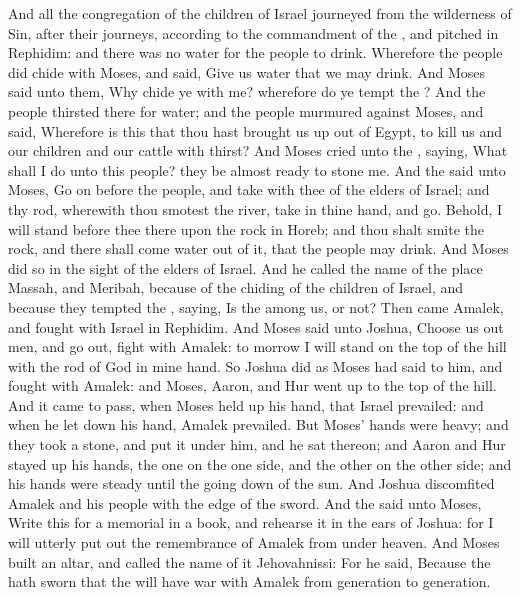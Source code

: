 \begin{biblechapter} %
 And all the congregation of the children of Israel journeyed from the wilderness of Sin, after their journeys, according to the commandment of the \LORD, and pitched in Rephidim: and there was no water for the people to drink.
\verse Wherefore the people did chide with Moses, and said, Give us water that we may drink. And Moses said unto them, Why chide ye with me? wherefore do ye tempt the \LORD?
\verse And the people thirsted there for water; and the people murmured against Moses, and said, Wherefore is this that thou hast brought us up out of Egypt, to kill us and our children and our cattle with thirst?
\verse And Moses cried unto the \LORD, saying, What shall I do unto this people? they be almost ready to stone me.
\verse And the \LORD said unto Moses, Go on before the people, and take with thee of the elders of Israel; and thy rod, wherewith thou smotest the river, take in thine hand, and go.
\verse Behold, I will stand before thee there upon the rock in Horeb; and thou shalt smite the rock, and there shall come water out of it, that the people may drink. And Moses did so in the sight of the elders of Israel.
\verse And he called the name of the place Massah, and Meribah, because of the chiding of the children of Israel, and because they tempted the \LORD, saying, Is the \LORD among us, or not?
 Then came Amalek, and fought with Israel in Rephidim.
\verse And Moses said unto Joshua, Choose us out men, and go out, fight with Amalek: to morrow I will stand on the top of the hill with the rod of God in mine hand.
\verse So Joshua did as Moses had said to him, and fought with Amalek: and Moses, Aaron, and Hur went up to the top of the hill.
\verse And it came to pass, when Moses held up his hand, that Israel prevailed: and when he let down his hand, Amalek prevailed.
\verse But Moses' hands were heavy; and they took a stone, and put it under him, and he sat thereon; and Aaron and Hur stayed up his hands, the one on the one side, and the other on the other side; and his hands were steady until the going down of the sun.
\verse And Joshua discomfited Amalek and his people with the edge of the sword.
\verse And the \LORD said unto Moses, Write this for a memorial in a book, and rehearse it in the ears of Joshua: for I will utterly put out the remembrance of Amalek from under heaven.
\verse And Moses built an altar, and called the name of it Jehovahnissi:
\verse For he said, Because the \LORD hath sworn that the \LORD will have war with Amalek from generation to generation.
\end{biblechapter}

